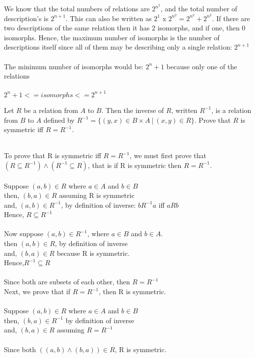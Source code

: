 \documentclass[addpoints]{exam}
\begin{document}
\begin{questions}
\begin{parts}
  \begin{solution}
    We know that the total numbers of relations are $2^{n^2}$, and the total number of description's is $2^{n+1}$.
    This can also be written as $2^{1}$ x $2^{n^2} = 2^{n^2} + 2^{n^2}$. If there are two descriptions of the same relation then it has 2 isomorphs, and if one, then 0 isomorphs. Hence, the maximum number of isomorphs is the number of descriptions itself since all of them may be describing only a single relation: $2^{n+1}$
    \\
    \\The minimum number of isomorphs would be: $2^{n} + 1$ because only one of the relations 
    \\
    \\ $2^{n} + 1 <= isomorphs <= 2^{n+1}$
  \end{solution}

\end{parts}

\question Let $R$ be a relation from $A$ to $B$. Then the inverse of $R$, written $R^{-1}$, is a relation from $B$ to $A$ defined by $R^{-1} = \{(y,x) \in B \times A \:|\: (x,y) \in R\}$. Prove that $R$ is symmetric iff $R = R^{-1}$.

  \begin{solution}
    \\To prove that R is symmetric iff $R = R^{-1}$, we must first prove that $(R \subseteq R^{-1}) \wedge (R^{-1} \subseteq R)$, that is if R is symmetric then $R = R^{-1}$. 
    \\
    \\Suppose $(a, b) \in R $ where $a \in A$ and $b \in B$
    \\then, $(b, a) \in R$ assuming R is symmetric
    \\and, $(a, b) \in R^{-1}$, by definition of inverse: $b R^{-1} a$ iff $a R b$
    \\Hence, $R \subseteq R^{-1}$
    \\
    \\Now suppose $(a,b) \in R^{-1}$, where $a \in B$ and $b \in A$.
    \\then $(a, b) \in R$, by definition of inverse
    \\and, $(b, a) \in R$ because R is symmetric.
    \\Hence,$R^{-1} \subseteq R$
    \\
    \\Since both are subsets of each other, then $R = R^{-1}$
    \\Next, we prove that if $R = R^{-1}$, then R is symmetric.
    \\
    \\Suppose $(a, b) \in R $ where $a \in A$ and $b \in B$
    \\then, $(b, a) \in R^{-1}$ by definition of inverse
    \\and, $(b, a) \in R$ assuming $R = R^{-1}$
    \\
    \\Since both $((a, b) \wedge (b, a)) \in R$, R is symmetric.
  \end{solution}


\end{questions}
\end{document}
